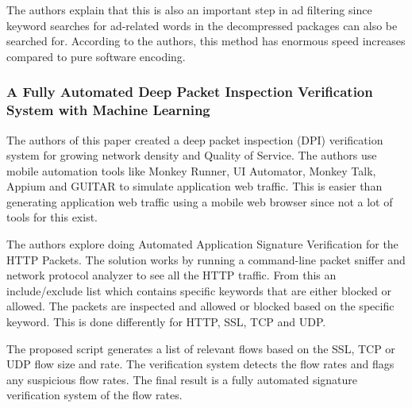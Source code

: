 The authors explain that this is also an important step in ad filtering since keyword searches for ad-related words in the decompressed packages can also be searched for. According to the authors, this method has enormous speed increases compared to pure software encoding.

\subsubsection{A Fully Automated Deep Packet Inspection Verification System with Machine Learning \cite{7947802}}
The authors of this paper created a deep packet inspection (DPI) verification system for growing network density and Quality of Service. The authors use mobile automation tools like Monkey Runner, UI Automator, Monkey Talk, Appium and GUITAR to simulate application web traffic. This is easier than generating application web traffic using a mobile web browser since not a lot of tools for this exist.

The authors explore doing Automated Application Signature Verification for the HTTP Packets. The solution works by running a command-line packet sniffer and network protocol analyzer to see all the HTTP traffic. From this an include/exclude list which contains specific keywords that are either blocked or allowed. The packets are inspected and allowed or blocked based on the specific keyword. This is done differently for HTTP, SSL, TCP and UDP.

The proposed script generates a list of relevant flows based on the SSL, TCP or UDP flow size and rate. The verification system detects the flow rates and flags any suspicious flow rates. The final result is a fully automated signature verification system of the flow rates.


